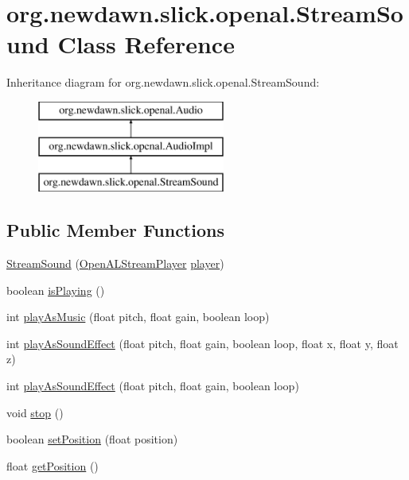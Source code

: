 \hypertarget{classorg_1_1newdawn_1_1slick_1_1openal_1_1_stream_sound}{}\section{org.\+newdawn.\+slick.\+openal.\+Stream\+Sound Class Reference}
\label{classorg_1_1newdawn_1_1slick_1_1openal_1_1_stream_sound}
Inheritance diagram for org.\+newdawn.\+slick.\+openal.\+Stream\+Sound\+:\begin{figure}[H]
\begin{center}
\leavevmode
\includegraphics[height=3.000000cm]{classorg_1_1newdawn_1_1slick_1_1openal_1_1_stream_sound}
\end{center}
\end{figure}
\subsection*{Public Member Functions}
\begin{DoxyCompactItemize}
\item 
\mbox{\hyperlink{classorg_1_1newdawn_1_1slick_1_1openal_1_1_stream_sound_af8a1307e584f0d319ff61b3b1bd40edb}{Stream\+Sound}} (\mbox{\hyperlink{classorg_1_1newdawn_1_1slick_1_1openal_1_1_open_a_l_stream_player}{Open\+A\+L\+Stream\+Player}} \mbox{\hyperlink{classorg_1_1newdawn_1_1slick_1_1openal_1_1_stream_sound_a5e4d0d6e22af804ce94996f6ab90872f}{player}})
\item 
boolean \mbox{\hyperlink{classorg_1_1newdawn_1_1slick_1_1openal_1_1_stream_sound_a286c8ab056d5b6715e5e3155c3e91508}{is\+Playing}} ()
\item 
int \mbox{\hyperlink{classorg_1_1newdawn_1_1slick_1_1openal_1_1_stream_sound_ac7efc7d8db3fe1f34edae365c7d226fe}{play\+As\+Music}} (float pitch, float gain, boolean loop)
\item 
int \mbox{\hyperlink{classorg_1_1newdawn_1_1slick_1_1openal_1_1_stream_sound_abe05a7275f7f2918b9ff19226dece301}{play\+As\+Sound\+Effect}} (float pitch, float gain, boolean loop, float x, float y, float z)
\item 
int \mbox{\hyperlink{classorg_1_1newdawn_1_1slick_1_1openal_1_1_stream_sound_a5dd8c3584d4f80a2a73abf596adddf86}{play\+As\+Sound\+Effect}} (float pitch, float gain, boolean loop)
\item 
void \mbox{\hyperlink{classorg_1_1newdawn_1_1slick_1_1openal_1_1_stream_sound_a60b0a64ffdf99dfde3e3679323cbd647}{stop}} ()
\item 
boolean \mbox{\hyperlink{classorg_1_1newdawn_1_1slick_1_1openal_1_1_stream_sound_aa530fe0393188182c1a956f6c381a937}{set\+Position}} (float position)
\item 
float \mbox{\hyperlink{classorg_1_1newdawn_1_1slick_1_1openal_1_1_stream_sound_a80df2cee9e1a68cd0c0bdb2f9140ffe6}{get\+Position}} ()
\end{DoxyCompactItemize}

